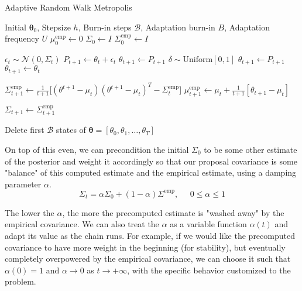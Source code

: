 \documentclass{article}
\begin{document}
    \begin{algorithm}
      \caption{Adaptive Random Walk Metropolis}\label{alg:adaptive_metro}
      \begin{algorithmic}

      \Require Initial $\boldsymbol{\theta}_0$, Stepsize $h$, Burn-in steps $\mathcal{B}$, Adaptation burn-in $B$, Adaptation frequency $U$
      \State $\mu_0^\mathrm{emp} \gets 0$ 
      \State $\Sigma_0 \gets I$
      \State $\Sigma^\mathrm{emp}_0 \gets I$

          \State $\epsilon_t \sim \mathcal{N}(0, \Sigma_t)$ 
          \State $P_{t+1} \gets \theta_t + \epsilon_t$
              \State $\theta_{t+1} \gets P_{t+1}$ 
          \Else
              \State $\delta \sim \mathrm{Uniform}[0, 1]$
                  \State $\theta_{t+1} \gets P_{t+1}$ 
              \Else 
                  \State $\theta_{t+1} \gets \theta_t$
              \EndIf
          \EndIf
          
          \State $\Sigma^\mathrm{emp}_{t+1} \gets \frac{1}{t+1} \big[(\theta^{t+1} - \mu_t) (\theta^{t+1} - \mu_t)^T - \Sigma^\mathrm{emp}_t \big]$
          \State $\mu_{t+1}^{\mathrm{emp}} \gets \mu_t + \frac{1}{t+1} [ \theta_{t+1} - \mu_t ]$
          
              \State $\Sigma_{t+1} \gets \Sigma^\mathrm{emp}_{t+1}$
          \EndIf
      \EndFor

      \State Delete first $\mathcal{B}$ states of $\boldsymbol{\theta} = [\theta_0, \theta_1, \ldots, \theta_T]$

      \end{algorithmic}
    \end{algorithm}

    On top of this even, we can precondition the initial $\Sigma_0$ to be some other estimate of the posterior and weight it accordingly so that our proposal covariance is some "balance" of this computed estimate and the empirical estimate, using a damping parameter $\alpha$. 
    \begin{equation}
      \Sigma_t = \alpha \Sigma_0 + (1 - \alpha) \Sigma^{\mathrm{emp}}, \;\;\;\;\; 0 \leq \alpha \leq 1
    \end{equation}

    The lower the $\alpha$, the more the precomputed estimate is "washed away" by the empirical covariance. We can also treat the $\alpha$ as a variable function $\alpha(t)$ and adapt its value as the chain runs. For example, if we would like the precomputed covariance to have more weight in the beginning (for stability), but eventually completely overpowered by the empirical covariance, we can choose it such that $\alpha(0) = 1$ and $\alpha \rightarrow 0$ as $t \rightarrow +\infty$, with the specific behavior customized to the problem. 
\end{document}
